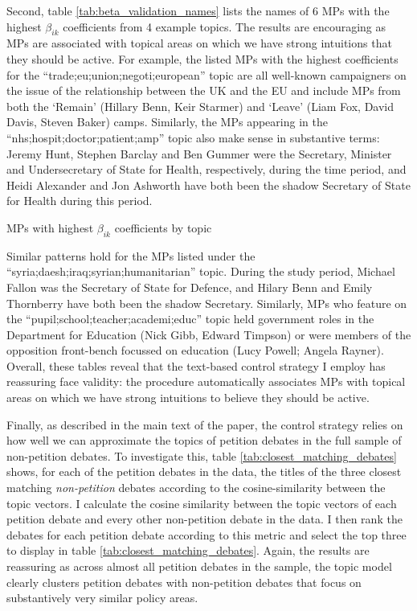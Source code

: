 \documentclass[12pt]{article}
\begin{document}
Second, table \ref{tab:beta_validation_names} lists the names of 6 MPs with the highest $\beta_{ik}$ coefficients from 4 example topics. The results are encouraging as MPs are associated with topical areas on which we have strong intuitions that they should be active. For example, the listed MPs with the highest coefficients for the ``trade;eu;union;negoti;european'' topic are all well-known campaigners on the issue of the relationship between the UK and the EU and include MPs from both the `Remain' (Hillary Benn, Keir Starmer) and `Leave' (Liam Fox, David Davis, Steven Baker) camps. Similarly, the MPs appearing in the ``nhs;hospit;doctor;patient;amp'' topic also make sense in substantive terms: Jeremy Hunt, Stephen Barclay and Ben Gummer were the Secretary, Minister and Undersecretary of State for Health, respectively, during the time period, and Heidi Alexander and Jon Ashworth have both been the shadow Secretary of State for Health during this period. 


\begin{table}
\caption{MPs with highest $\beta_{ik}$ coefficients by topic}\label{tab:beta_validation_names}
\vspace{-1cm}
\begin{center}
 
\vspace{-.5cm}
\end{center}
\end{table}

Similar patterns hold for the MPs listed under the ``syria;daesh;iraq;syrian;humanitarian'' topic. During the study period, Michael Fallon was the Secretary of State for Defence, and Hilary Benn and Emily Thornberry have both been the shadow Secretary. Similarly, MPs who feature on the ``pupil;school;teacher;academi;educ'' topic held government roles in the Department for Education (Nick Gibb, Edward Timpson) or were members of the opposition front-bench focussed on education (Lucy Powell; Angela Rayner). Overall, these tables reveal that the text-based control strategy I employ has reassuring face validity: the procedure automatically associates MPs with topical areas on which we have strong intuitions to believe they should be active.

Finally, as described in the main text of the paper, the control strategy relies on how well we can approximate the topics of petition debates in the full sample of non-petition debates. To investigate this, table \ref{tab:closest_matching_debates} shows, for each of the petition debates in the data, the titles of the three closest matching \emph{non-petition} debates according to the cosine-similarity between the topic vectors. I calculate the cosine similarity between the topic vectors of each petition debate and every other non-petition debate in the data. I then rank the debates for each petition debate according to this metric and select the top three to display in table \ref{tab:closest_matching_debates}.
Again, the results are reassuring as across almost all petition debates in the sample, the topic model clearly clusters petition debates with non-petition debates that focus on substantively very similar policy areas. 
\end{document}
